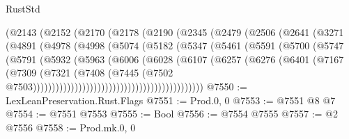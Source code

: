 \begin{lexlean}{RustStd}
\begin{coremodule}
                        (@2143
                          (@2152
                            (@2170
                              (@2178
                                (@2190
                                  (@2345
                                    (@2479
                                      (@2506
                                        (@2641
                                          (@3271
                                            (@4891
                                              (@4978
                                                (@4998
                                                  (@5074
                                                    (@5182
                                                      (@5347
                                                        (@5461
                                                          (@5591
                                                            (@5700
                                                              (@5747
                                                                (@5791
                                                                  (@5932
                                                                    (@5963
                                                                      (@6006
                                                                        (@6028
                                                                          (@6107
                                                                            (@6257
                                                                              (@6276
                                                                                (@6401
                                                                                  (@7167
                                                                                    (@7309
                                                                                      (@7321
                                                                                        (@7408
                                                                                          (@7445
                                                                                            (@7502
                                                                                              @7503)))))))))))))))))))))))))))))))))))))))))))))
@7550 := LexLeanPreservation.Rust.Flags
@7551 := Prod.{0, 0}
@7553 := @7551 @8 @7
@7554 := @7551 @7553
@7555 := Bool
@7556 := @7554 @7555
@7557 := @2 @7556
@7558 := Prod.mk.{0, 0}

\end{coremodule}
\end{lexlean}
